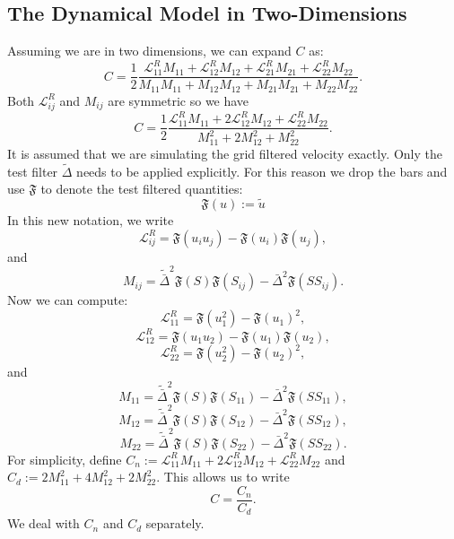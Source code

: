 \documentclass[11pt,a4paper]{article}
\begin{document}
\subsection{The Dynamical Model in Two-Dimensions}
Assuming we are in two dimensions, we can expand $C$ as:
$$C = \frac{1}{2}\frac{\mathscr{L}^R_{11} M_{11}+\mathscr{L}^R_{12} M_{12}+\mathscr{L}^R_{21} M_{21}+\mathscr{L}^R_{22} M_{22}}{M_{11} M_{11}+M_{12} M_{12}+M_{21} M_{21}+M_{22} M_{22}}.$$
Both $\mathscr{L}^R_{ij}$ and $M_{ij}$ are symmetric so we have
$$C = \frac{1}{2}\frac{\mathscr{L}^R_{11} M_{11}+2\mathscr{L}^R_{12} M_{12}+\mathscr{L}^R_{22} M_{22}}{M_{11}^2+2M_{12}^2+M_{22}^2}.$$
It is assumed that we are simulating the grid filtered velocity exactly. Only the test filter $\tilde{\Delta}$ needs to be applied explicitly. For this reason we drop the bars and use $\mathfrak{F}$ to denote the test filtered quantities:
$$\mathfrak{F}(u) := \tilde{u}$$
In this new notation, we write
$$\mathscr{L}^R_{ij} = \mathfrak{F}\left( u_i u_j\right) - \mathfrak{F}\left(u_i\right)\mathfrak{F}\left(u_j\right),$$
and
$$M_{ij} = \tilde{\bar{\Delta}}^2\mathfrak{F}\left(S\right)\mathfrak{F}\left({S}_{ij}\right) - \bar{\Delta}^2\mathfrak{F}\left(S{S}_{ij}\right).$$
Now we can compute:
$$\mathscr{L}^R_{11} = \mathfrak{F}\left( u_1^2\right) - \mathfrak{F}\left(u_1\right)^2,$$
$$\mathscr{L}^R_{12} = \mathfrak{F}\left( u_1u_2\right) - \mathfrak{F}\left(u_1\right)\mathfrak{F}\left(u_2\right),$$
$$\mathscr{L}^R_{22} = \mathfrak{F}\left( u_2^2\right) - \mathfrak{F}\left(u_2\right)^2,$$
and
$$M_{11} = \tilde{\bar{\Delta}}^2\mathfrak{F}\left(S\right)\mathfrak{F}\left({S}_{11}\right) - \bar{\Delta}^2\mathfrak{F}\left(S{S}_{11}\right),$$
$$M_{12} = \tilde{\bar{\Delta}}^2\mathfrak{F}\left(S\right)\mathfrak{F}\left({S}_{12}\right) - \bar{\Delta}^2\mathfrak{F}\left(S{S}_{12}\right),$$
$$M_{22} = \tilde{\bar{\Delta}}^2\mathfrak{F}\left(S\right)\mathfrak{F}\left({S}_{22}\right) - \bar{\Delta}^2\mathfrak{F}\left(S{S}_{22}\right).$$
For simplicity, define $C_n := \mathscr{L}^R_{11} M_{11}+2\mathscr{L}^R_{12} M_{12}+\mathscr{L}^R_{22} M_{22}$ and $C_d:= 2M_{11}^2+4M_{12}^2+2M_{22}^2$. This allows us to write
\begin{equation}
C = \frac{C_n}{C_d}.
\end{equation}
We deal with $C_n$ and $C_d$ separately. 
\end{document}
